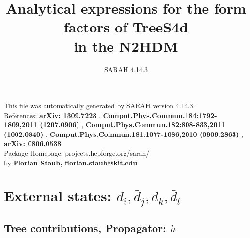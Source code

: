 \documentclass[A4,landscape]{article}
\begin{document}
\title{Analytical expressions for the form factors of TreeS4d\\ in the N2HDM } 
 \author{SARAH 4.14.3} 
 \maketitle 
 \vspace{10cm} 
This file was automatically generated by SARAH version 4.14.3.  \\ 
References: {\bf arXiv: 1309.7223 }, {\bf Comput.Phys.Commun.184:1792-1809,2011 (1207.0906) }, {\bf Comput.Phys.Commun.182:808-833,2011 (1002.0840) }, {\bf Comput.Phys.Commun.181:1077-1086,2010 (0909.2863) }, {\bf arXiv: 0806.0538 } \\ 
Package Homepage: projects.hepforge.org/sarah/ \\ 
by {\bf Florian Staub, florian.staub@kit.edu} 
 \pagebreak 
 \tableofcontents 
 \pagebreak 
\section{External states: ${d_{{i}}, \bar{d}_{{j}}, d_{{k}}, \bar{d}_{{l}}}$} 
\subsection{Tree contributions, Propagator: $h$} 
\end{document}

